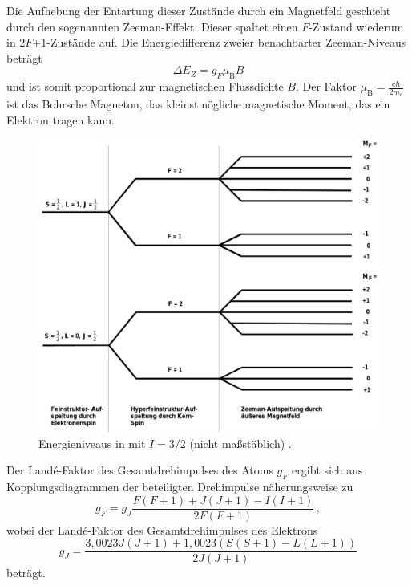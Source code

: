 Die Aufhebung der Entartung dieser Zustände durch ein Magnetfeld geschieht durch den sogenannten Zeeman-Effekt. Dieser spaltet einen $F$-Zustand wiederum in $2F$+1-Zustände auf. Die Energiedifferenz zweier benachbarter Zeeman-Niveaus beträgt
\begin{equation}
\Delta E_Z = g_F \mu_{\text{B}} B
\label{eqn:zeemanDifferenz}
\end{equation}
und ist somit proportional zur magnetischen Flussdichte $B$. Der Faktor $\mu_{\text{B}} = \frac{e \hbar}{2m_e}$ ist das Bohrsche Magneton, das kleinstmögliche magnetische Moment, das ein Elektron tragen kann.
\newpage
\begin{figure}
  	\centering
  	\includegraphics[width=\textwidth]{content/images/energieniveaus.png}
  	\caption{Energieniveaus in  mit $I=3/2$ (nicht maßstäblich) \cite{energieniveaus}.}
  	\label{fig:energieniveaus}
\end{figure}

\noindent Der Landé-Faktor des Gesamtdrehimpulses des Atoms $g_F$ ergibt sich aus Kopplungsdiagrammen der beteiligten Drehimpulse näherungsweise zu
\begin{equation}
g_F = g_J \frac{F(F+1)+J(J+1)-I(I+1)}{2F(F+1)}\,,
\label{eqn:g_F_Theorie}
\end{equation}
wobei der Landé-Faktor des Gesamtdrehimpulses des Elektrons
\begin{equation}
g_J = \frac{3{,}0023J(J+1)+1{,}0023(S(S+1)-L(L+1))}{2J(J+1)}
\label{eqn:g_J_Theorie}
\end{equation}
beträgt.

